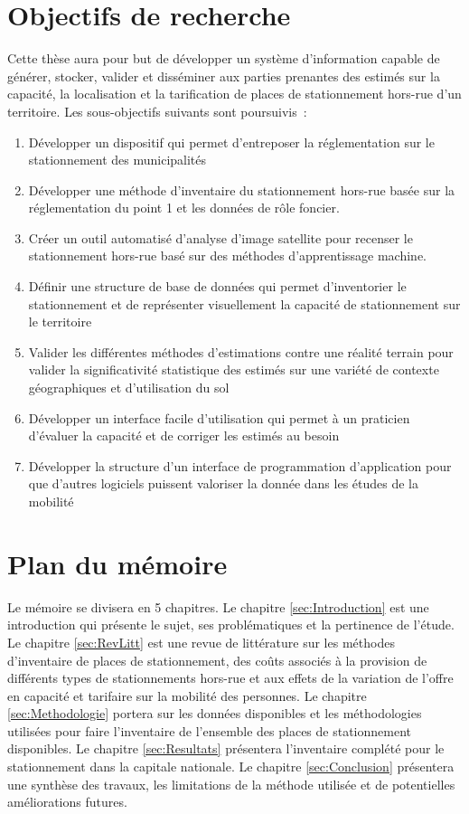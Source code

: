 \section{Objectifs de recherche}  \label{sec:obj_recherche}%
Cette thèse aura pour but de développer un système d'information capable de générer, stocker, valider et disséminer aux parties prenantes des estimés sur la capacité, la localisation et la tarification de places de stationnement hors-rue d'un territoire. Les sous-objectifs suivants sont poursuivis :

\begin{enumerate}
\item Développer un dispositif qui permet d'entreposer la réglementation sur le stationnement des municipalités 
\item Développer une méthode d'inventaire du stationnement hors-rue basée sur la réglementation du point 1 et les données de rôle foncier.
\item Créer un outil automatisé d'analyse d'image satellite pour recenser le stationnement hors-rue basé sur des méthodes d'apprentissage machine.
\item Définir une structure de base de données qui permet d'inventorier le stationnement et de représenter visuellement la capacité de stationnement sur le territoire
\item Valider les différentes méthodes d'estimations contre une réalité terrain pour valider la significativité statistique des estimés sur une variété de contexte géographiques et d'utilisation du sol
\item Développer un interface facile d'utilisation qui permet à un praticien d'évaluer la capacité et de corriger les estimés au besoin
\item Développer la structure d'un interface de programmation d'application pour que d'autres logiciels puissent valoriser la donnée dans les études de la mobilité
\end{enumerate}

\section{Plan du mémoire}  %

Le mémoire se divisera en 5 chapitres. Le chapitre \ref{sec:Introduction} est une introduction qui présente le sujet, ses problématiques et la pertinence de l'étude. Le chapitre \ref{sec:RevLitt} est une revue de littérature sur les méthodes d'inventaire de places de stationnement, des coûts associés à la provision de différents types de stationnements hors-rue et aux effets de la variation de l'offre en capacité et tarifaire sur la mobilité des personnes. Le chapitre \ref{sec:Methodologie} portera sur les données disponibles et les méthodologies utilisées pour faire l'inventaire de l'ensemble des places de stationnement disponibles. Le chapitre \ref{sec:Resultats} présentera l'inventaire complété pour le stationnement dans la capitale nationale. Le chapitre \ref{sec:Conclusion} présentera une synthèse des travaux, les limitations de la méthode utilisée et de potentielles améliorations futures.

\clearpage
